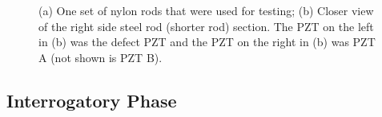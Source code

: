 \begin{figure}
\begin{subfigmatrix}{2}
\end{subfigmatrix}

  \caption[all]
  { \label{fig:nylonTR}
(a) One set of nylon rods that were used for testing;
(b) Closer view of the right side steel rod (shorter rod) section. The PZT on the left in (b) was the defect PZT and the PZT on the right in (b) was PZT A (not shown is PZT B).
}
\end{figure}

\subsection{Interrogatory Phase}

